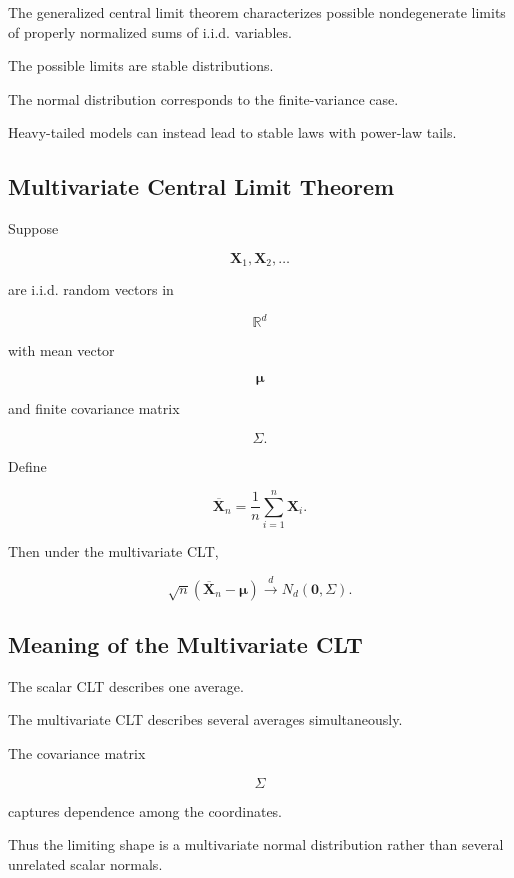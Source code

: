 The generalized central limit theorem characterizes possible
nondegenerate limits of properly normalized sums of i.i.d. variables.

The possible limits are stable distributions.

The normal distribution corresponds to the finite-variance case.

Heavy-tailed models can instead lead to stable laws with power-law
tails.

\subsection{Multivariate Central Limit Theorem}
\label{subsec:multivariate-clt}

Suppose

\[
\mathbf{X}_1,\mathbf{X}_2,\ldots
\]

are i.i.d. random vectors in

\[
\mathbb{R}^d
\]

with mean vector

\[
\boldsymbol{\mu}
\]

and finite covariance matrix

\[
\Sigma.
\]

Define

\[
\overline{\mathbf{X}}_n
=
\frac1n
\sum_{i=1}^{n}\mathbf{X}_i.
\]

Then under the multivariate CLT,

\[
\boxed{
\sqrt{n}
\left(
\overline{\mathbf{X}}_n
-
\boldsymbol{\mu}
\right)
\xrightarrow{d}
N_d(\mathbf{0},\Sigma).
}
\]

\subsection{Meaning of the Multivariate CLT}
\label{subsec:meaning-multivariate-clt}

The scalar CLT describes one average.

The multivariate CLT describes several averages simultaneously.

The covariance matrix

\[
\Sigma
\]

captures dependence among the coordinates.

Thus the limiting shape is a multivariate normal distribution rather
than several unrelated scalar normals.

